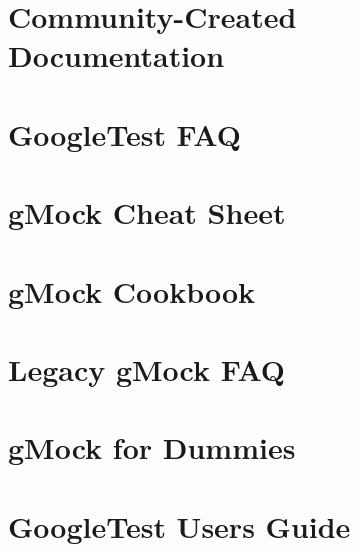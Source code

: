 \let\mypdfximage\pdfximage\def\pdfximage{\immediate\mypdfximage}\documentclass[twoside]{book}
\newcommand{\+}{\discretionary{\mbox{\scriptsize$\hookleftarrow$}}{}{}}
\begin{document}
\chapter{Community-\/\+Created Documentation}
\label{md_04_cmake_build_debug__deps_googletest_src_docs_community_created_documentation}

\chapter{Google\+Test FAQ}
\label{md_04_cmake_build_debug__deps_googletest_src_docs_faq}

\chapter{g\+Mock Cheat Sheet}
\label{md_04_cmake_build_debug__deps_googletest_src_docs_gmock_cheat_sheet}

\chapter{g\+Mock Cookbook}
\label{md_04_cmake_build_debug__deps_googletest_src_docs_gmock_cook_book}

\chapter{Legacy g\+Mock FAQ}
\label{md_04_cmake_build_debug__deps_googletest_src_docs_gmock_faq}

\chapter{g\+Mock for Dummies}
\label{md_04_cmake_build_debug__deps_googletest_src_docs_gmock_for_dummies}

\chapter{Google\+Test User\textquotesingle{}s Guide}
\label{md_04_cmake_build_debug__deps_googletest_src_docs_index}

\end{document}

